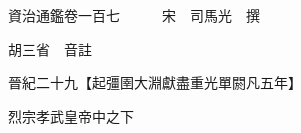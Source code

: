 










 


 
 


 

  
  
  
  
  





  
  
  
  
  
 
  

  

  
  
  



  

 
 

  
   




  

  
  


  　　資治通鑑卷一百七　　　宋　司馬光　撰

　　胡三省　音註

　　晉紀二十九【起彊圉大淵獻盡重光單閼凡五年】

　　烈宗孝武皇帝中之下

